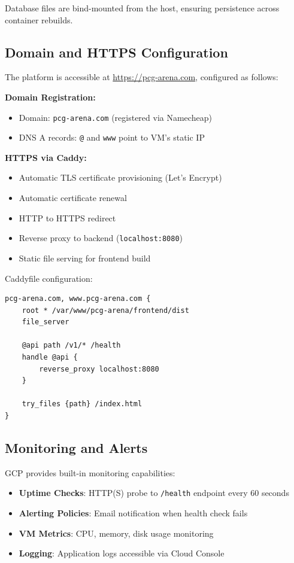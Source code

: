 \documentclass[11pt,a4paper]{article}
\theoremstyle{plain}
\theoremstyle{definition}
\theoremstyle{remark}
\begin{document}
Database files are bind-mounted from the host, ensuring persistence across container rebuilds.

\subsection{Domain and HTTPS Configuration}
\label{subsec:domain}

The platform is accessible at \url{https://pcg-arena.com}, configured as follows:

\textbf{Domain Registration:}
\begin{itemize}
    \item Domain: \texttt{pcg-arena.com} (registered via Namecheap)
    \item DNS A records: \texttt{@} and \texttt{www} point to VM's static IP
\end{itemize}

\textbf{HTTPS via Caddy:}
\begin{itemize}
    \item Automatic TLS certificate provisioning (Let's Encrypt)
    \item Automatic certificate renewal
    \item HTTP to HTTPS redirect
    \item Reverse proxy to backend (\texttt{localhost:8080})
    \item Static file serving for frontend build
\end{itemize}

Caddyfile configuration:

\begin{lstlisting}
pcg-arena.com, www.pcg-arena.com {
    root * /var/www/pcg-arena/frontend/dist
    file_server
    
    @api path /v1/* /health
    handle @api {
        reverse_proxy localhost:8080
    }
    
    try_files {path} /index.html
}
\end{lstlisting}

\subsection{Monitoring and Alerts}
\label{subsec:monitoring}

GCP provides built-in monitoring capabilities:

\begin{itemize}
    \item \textbf{Uptime Checks}: HTTP(S) probe to \texttt{/health} endpoint every 60 seconds
    \item \textbf{Alerting Policies}: Email notification when health check fails
    \item \textbf{VM Metrics}: CPU, memory, disk usage monitoring
    \item \textbf{Logging}: Application logs accessible via Cloud Console
\end{itemize}
\end{document}
